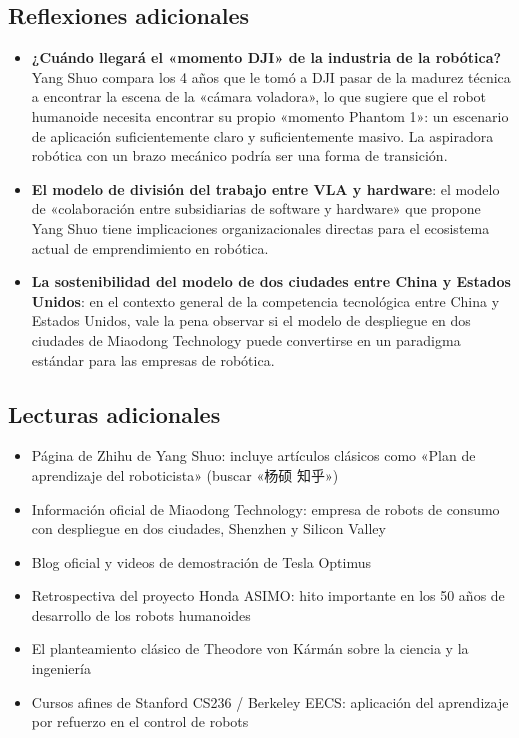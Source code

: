 \subsection{Reflexiones adicionales}

\begin{itemize}
    \item \textbf{¿Cuándo llegará el «momento DJI» de la industria de la robótica?} Yang Shuo compara los 4 años que le tomó a DJI pasar de la madurez técnica a encontrar la escena de la «cámara voladora», lo que sugiere que el robot humanoide necesita encontrar su propio «momento Phantom 1»: un escenario de aplicación suficientemente claro y suficientemente masivo. La aspiradora robótica con un brazo mecánico podría ser una forma de transición.
    \item \textbf{El modelo de división del trabajo entre VLA y hardware}: el modelo de «colaboración entre subsidiarias de software y hardware» que propone Yang Shuo tiene implicaciones organizacionales directas para el ecosistema actual de emprendimiento en robótica.
    \item \textbf{La sostenibilidad del modelo de dos ciudades entre China y Estados Unidos}: en el contexto general de la competencia tecnológica entre China y Estados Unidos, vale la pena observar si el modelo de despliegue en dos ciudades de Miaodong Technology puede convertirse en un paradigma estándar para las empresas de robótica.
\end{itemize}

\subsection{Lecturas adicionales}

\begin{itemize}
    \item Página de Zhihu de Yang Shuo: incluye artículos clásicos como «Plan de aprendizaje del roboticista» (buscar «杨硕 知乎»)
    \item Información oficial de Miaodong Technology: empresa de robots de consumo con despliegue en dos ciudades, Shenzhen y Silicon Valley
    \item Blog oficial y videos de demostración de Tesla Optimus
    \item Retrospectiva del proyecto Honda ASIMO: hito importante en los 50 años de desarrollo de los robots humanoides
    \item El planteamiento clásico de Theodore von K\'arm\'an sobre la ciencia y la ingeniería
    \item Cursos afines de Stanford CS236 / Berkeley EECS: aplicación del aprendizaje por refuerzo en el control de robots
\end{itemize}



